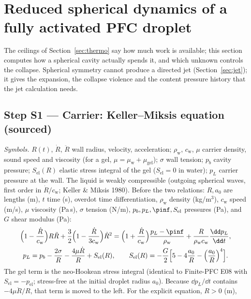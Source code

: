 \section{Reduced spherical dynamics of a fully activated PFC droplet}\label{sec:spherical}
The ceilings of Section~\ref{sec:thermo} say how much work is available; this section computes how a
spherical cavity actually spends it, and which unknown controls the collapse. Spherical symmetry
cannot produce a directed jet (Section~\ref{sec:jet}); it gives the expansion, the collapse
violence and the content pressure history that the jet calculation needs.

\subsection{Step S1 --- Carrier: Keller--Miksis equation (sourced)}
\emph{Symbols.} $R(t)$, $\dot R$, $\ddot R$ wall radius, velocity, acceleration; $\rho_{\mathrm w}$,
$c_{\mathrm w}$, $\mu$ carrier density, sound speed and viscosity (for a gel, $\mu=\mu_{\mathrm w}+\mu_{\mathrm{gel}}$);
$\sigma$ wall tension; $p_b$ cavity pressure; $S_{\mathrm{el}}(R)$ elastic stress integral of the gel
($S_{\mathrm{el}}=0$ in water);
$p_L$ carrier pressure at the wall. The liquid is weakly compressible (outgoing spherical
waves, first order in $\dot R/c_{\mathrm w}$; Keller \& Miksis 1980). Before the two relations:
$R,a_0$ are lengths (m), $t$ time (s), overdot time differentiation, $\rho_{\mathrm w}$ density
(kg/m$^3$), $c_{\mathrm w}$ speed (m/s), $\mu$ viscosity (Pa\,s), $\sigma$ tension (N/m),
$p_b,p_L,\pinf,S_{\mathrm{el}}$ pressures (Pa), and $G$ shear modulus (Pa):
\begin{gather}
\Bigl(1-\frac{\dot R}{c_{\mathrm w}}\Bigr)R\ddot R+\frac32\Bigl(1-\frac{\dot R}{3c_{\mathrm w}}\Bigr)\dot R^2
=\Bigl(1+\frac{\dot R}{c_{\mathrm w}}\Bigr)\frac{p_L-\pinf}{\rho_{\mathrm w}}+\frac{R}{\rho_{\mathrm w}c_{\mathrm w}}\frac{\dd p_L}{\dd t},
\label{eq:km}\\
p_L=p_b-\frac{2\sigma}{R}-\frac{4\mu\dot R}{R}+S_{\mathrm{el}}(R),\qquad
S_{\mathrm{el}}(R)=-\frac G2\Bigl[5-4\frac{a_0}{R}-\Bigl(\frac{a_0}{R}\Bigr)^4\Bigr].\label{eq:gelS}
\end{gather}
The gel term is the neo-Hookean stress integral (identical to Finite-PFC E08 with
$S_{\mathrm{el}}=-p_{\mathrm{el}}$; stress-free at the initial droplet radius $a_0$). Because $\dd p_L/\dd t$ contains
$-4\mu\ddot R/R$, that term is moved to the left. For the explicit equation, $R>0$ (m),
